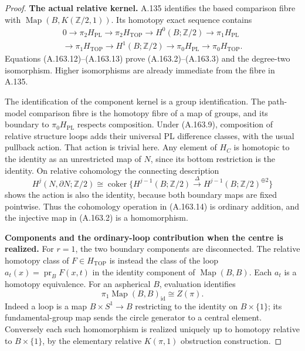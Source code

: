 \begin{proof}
\textbf{The actual relative kernel.}
A.135 identifies the based comparison fibre with
$\operatorname{Map}(B,K(\mathbb Z/2,1))$. Its homotopy exact sequence
contains
\[
\begin{split}
0\longrightarrow\pi_2H_{\mathrm{PL}}
 \longrightarrow\pi_2H_{\mathrm{TOP}}
 \longrightarrow H^0(B;\mathbb Z/2)
 \longrightarrow\pi_1H_{\mathrm{PL}}\\
 \longrightarrow\pi_1H_{\mathrm{TOP}}
 \longrightarrow H^1(B;\mathbb Z/2)
 \longrightarrow\pi_0H_{\mathrm{PL}}
 \longrightarrow\pi_0H_{\mathrm{TOP}}.
\end{split}                                                       \tag{A.163.14}
\]
Equations (A.163.12)--(A.163.13) prove (A.163.2)--(A.163.3) and the degree-two
isomorphism. Higher isomorphisms are already immediate from the
fibre in A.135.

The identification of the component kernel is a group identification.
The path-model comparison fibre is the homotopy fibre of a map of
groups, and its boundary to $\pi_0H_{\mathrm{PL}}$ respects composition.
Under (A.163.9), composition of relative structure loops adds their
universal PL difference classes, with the usual pullback action.
That action is trivial here. Any element of $H_C$ is homotopic to
the identity as an unrestricted map of $N$, since its bottom
restriction is the identity. On relative cohomology the connecting
description
\[
 H^j(N,\partial N;\mathbb Z/2)
  \cong \operatorname{coker}\{H^{j-1}(B;\mathbb Z/2)
     \xrightarrow{\Delta}H^{j-1}(B;\mathbb Z/2)^{\oplus2}\}
\]
shows the action is also the identity, because both boundary maps
are fixed pointwise. Thus the cohomology operation in (A.163.14) is
ordinary addition, and the injective map in (A.163.2) is a homomorphism.

\textbf{Components and the ordinary-loop contribution when the centre is realized.}
For $r=1$, the two boundary components are disconnected. The relative
homotopy class of $F\in H_{\mathrm{TOP}}$ is instead the class of the
loop $a_t(x)=\operatorname{pr}_B F(x,t)$ in the identity component of
$\operatorname{Map}(B,B)$. Each $a_t$ is a homotopy equivalence.
For an aspherical $B$, evaluation identifies
\[
 \pi_1\operatorname{Map}(B,B)_{\mathrm{id}}\cong Z(\pi).           \tag{A.163.15}
\]
Indeed a loop is a map $B\times S^1\to B$ restricting to the identity
on $B\times\{1\}$; its fundamental-group map sends the circle
generator to a central element. Conversely each such homomorphism
is realized uniquely up to homotopy relative to $B\times\{1\}$,
by the elementary relative $K(\pi,1)$ obstruction construction.


\end{proof}

